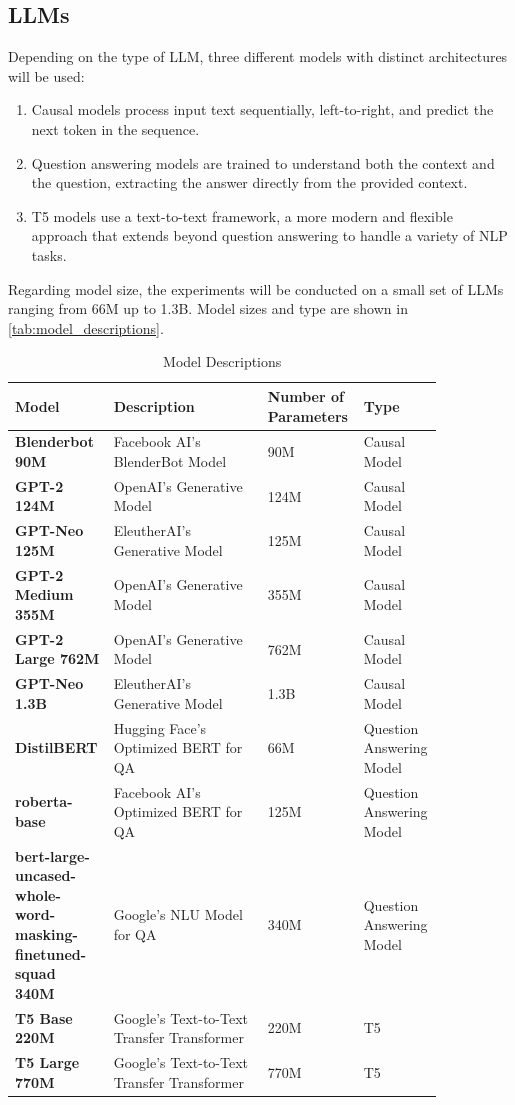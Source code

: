\documentclass{wseas}
\begin{document}
\subsection{LLMs}
Depending on the type of LLM, three different models with distinct architectures will be used:

\begin{enumerate} 
  \item Causal models process input text sequentially, left-to-right, and predict the next token in the sequence. 
  \item Question answering models are trained to understand both the context and the question, extracting the answer directly from the provided context. 
  \item T5 models use a text-to-text framework, a more modern and flexible approach that extends beyond question answering to handle a variety of NLP tasks. 
\end{enumerate}

Regarding model size, the experiments will be conducted on a small set of LLMs
ranging from 66M up to 1.3B. Model sizes and type are shown in \autoref{tab:model_descriptions}.
\begin{table}[htbp]
  \centering
  \caption{Model Descriptions} %
  \label{tab:model_descriptions}  %
  \begin{tabular}{|p{0.2\linewidth}|p{0.35\linewidth}|p{0.15\linewidth}|p{0.15\linewidth}|}
  \hline
  \textbf{Model} & \textbf{Description} & \textbf{Number of Parameters} & \textbf{Type} \\
  \hline
  \textbf{Blenderbot 90M} & Facebook AI's BlenderBot Model & 90M & Causal Model \\
  \hline
  \textbf{GPT-2 124M} & OpenAI's Generative Model & 124M & Causal Model \\
  \hline
  \textbf{GPT-Neo 125M} & EleutherAI's Generative Model & 125M & Causal Model \\
  \hline
  \textbf{GPT-2 Medium 355M} & OpenAI's Generative Model & 355M & Causal Model \\
  \hline
  \textbf{GPT-2 Large 762M} & OpenAI's Generative Model & 762M & Causal Model \\
  \hline
  \textbf{GPT-Neo 1.3B} & EleutherAI's Generative Model & 1.3B & Causal Model \\
  \hline
  \textbf{DistilBERT} & Hugging Face's Optimized BERT for QA & 66M & Question Answering Model \\
  \hline
  \textbf{roberta-base} & Facebook AI's Optimized BERT for QA & 125M & Question Answering Model \\
  \hline
  \textbf{bert-large-uncased-whole-word-masking-finetuned-squad 340M} & Google's NLU Model for QA & 340M & Question Answering Model \\
  \hline
  \textbf{T5 Base 220M} & Google's Text-to-Text Transfer Transformer & 220M & T5 \\
  \hline
  \textbf{T5 Large 770M} & Google's Text-to-Text Transfer Transformer & 770M & T5 \\
  \hline
  \end{tabular}
\end{table}  
\end{document}
